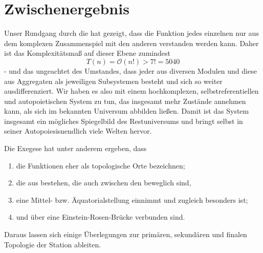 \section{Zwischenergebnis}%

Unser Rundgang durch die  hat gezeigt, dass die Funktion jedes einzelnen  nur aus dem komplexen Zusammenspiel mit den anderen  verstanden werden kann. Daher ist das Komplexitätsmaß auf dieser Ebene zumindest
\begin{equation}
    T(n) = \mathcal{O} (n!) > 7! = 5040
\end{equation}
- und das ungeachtet des Umstandes, dass jeder  aus diversen Modulen und diese aus Aggregaten als jeweiligen Subsystemen besteht und sich so weiter ausdifferenziert. Wir haben es also mit einem hochkomplexen, selbstreferentiellen und autopoietischen System zu tun, das insgesamt mehr Zustände annehmen kann, als sich im bekannten Universum abbilden ließen. Damit ist das System insgesamt ein mögliches Spiegelbild des Restuniversums und bringt selbst in seiner Autopoiesisnendlich viele Welten hervor.

Die Exegese hat unter anderem ergeben, dass 
\begin{enumerate}
    \item die  Funktionen eher als topologische Orte bezeichnen;
    \item die  aus  bestehen, die auch zwischen den  beweglich sind,
    \item {} eine Mittel- bzw. Äquatorialstellung einnimmt und zugleich besonders  ist;
    \item {} und  über eine Einstein-Rosen-Brücke verbunden sind.
\end{enumerate}

Daraus lassen sich einige Überlegungen zur primären, sekundären und finalen Topologie der Station ableiten.

